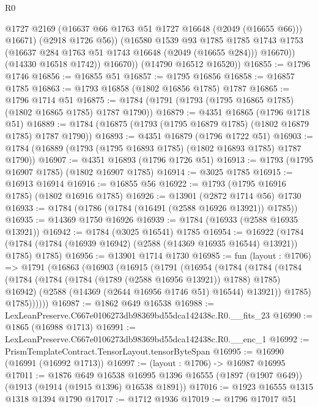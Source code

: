 \begin{lexlean}{R0}
\begin{coremodule}
                  @1727
                  @2169
                  (@16637 @66 @1763 @51 @1727 @16648 (@2049 (@16655 @66)))
                  @16671)
                (@2918 @1726 @56))
              (@16580
                @1539
                @93
                @1785
                @1785
                @1743
                @1753
                (@16637 @284 @1763 @51 @1743 @16648 (@2049 (@16655 @284)))
                @16670))
            (@14330 @16518 @1742))
          @16670))
      (@14790 @16512 @16520))
@16855 := @1796 @1746
@16856 := @16855 @51
@16857 := @1795 @16856
@16858 := @16857 @1785
@16863 := @1793 @16858 (@1802 @16856 @1785) @1787
@16865 := @1796 @1714 @51
@16875 := @1784 (@1791 (@1793 (@1795 @16865 @1785) (@1802 @16865 @1785) @1787 @1790))
@16879 := @4351 @16865 (@1796 @1718 @51)
@16889 := @1784 (@16875 (@1793 (@1795 @16879 @1785) (@1802 @16879 @1785) @1787 @1790))
@16893 := @4351 @16879 (@1796 @1722 @51)
@16903 := @1784 (@16889 (@1793 (@1795 @16893 @1785) (@1802 @16893 @1785) @1787 @1790))
@16907 := @4351 @16893 (@1796 @1726 @51)
@16913 := @1793 (@1795 @16907 @1785) (@1802 @16907 @1785)
@16914 := @3025 @1785
@16915 := @16913 @16914
@16916 := @16855 @56
@16922 := @1793 (@1795 @16916 @1785) (@1802 @16916 @1785)
@16926 := @13901 (@2872 @1714 @56) @1730
@16933 := @1784 (@1786 (@1784 (@16491 (@2588 @16926 @13921)) @1785))
@16935 := @14369 @1750 @16926
@16939 := @1784 (@16933 (@2588 @16935 @13921))
@16942 := @1784 (@3025 @16541) @1785
@16954 := @16922
    (@1784 (@1784 (@1784 (@16939 @16942) (@2588 (@14369 @16935 @16544) @13921)) @1785) @1785)
@16956 := @13901 @1714 @1730
@16985 := fun (layout : @1706) =>
  @1791
    (@16863
      (@16903
        (@16915
          (@1791
            (@16954
              (@1784
                (@1784
                  (@1784
                    (@1784 (@1784 (@1784 (@1789 (@2588 @16956 @13921)) @1788) @1785) @16942)
                    (@2588 (@14369 (@2644 @16956 @1746 @51) @16544) @13921))
                  @1785)
                @1785))))))
@16987 := @1862 @649 @16538
@16988 := LexLeanPreserve.C667e0106273db98369bd55dca142438c.R0.__fits_23
@16990 := @1865 (@16988 @1713)
@16991 := LexLeanPreserve.C667e0106273db98369bd55dca142438c.R0.__enc_1
@16992 := PrismTemplateContract.TensorLayout.tensorByteSpan
@16995 := @16990 (@16991 (@16992 @1713))
@16997 := (layout : @1706) -> @16987 @16995
@17011 := @1876
    @649
    @16538
    @16995
    @1396
    @16555
    (@1897 (@1907 @649))
    (@1913 (@1914 (@1915 @1396) @16538 @1891))
@17016 := @1923 @16555 @1315 @1318 @1394 @1790
@17017 := @1712 @1936
@17019 := @1796 @17017 @51

\end{coremodule}
\end{lexlean}

